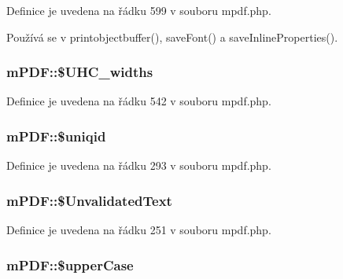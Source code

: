 Definice je uvedena na řádku 599 v souboru mpdf.\-php.



Používá se v printobjectbuffer(), save\-Font() a save\-Inline\-Properties().

\hypertarget{classm_p_d_f_ad63c2a05507035556f2a42057d801f39}{
\subsubsection[{\$\-U\-H\-C\-\_\-widths}]{\setlength{\rightskip}{0pt plus 5cm}m\-P\-D\-F\-::\$\-U\-H\-C\-\_\-widths}}\label{classm_p_d_f_ad63c2a05507035556f2a42057d801f39}


Definice je uvedena na řádku 542 v souboru mpdf.\-php.

\hypertarget{classm_p_d_f_a0cee5dd86653bfb742d11f239d2a665b}{
\subsubsection[{\$uniqid}]{\setlength{\rightskip}{0pt plus 5cm}m\-P\-D\-F\-::\$uniqid}}\label{classm_p_d_f_a0cee5dd86653bfb742d11f239d2a665b}


Definice je uvedena na řádku 293 v souboru mpdf.\-php.

\hypertarget{classm_p_d_f_a529e7530233ff3505dba95f3237e29e1}{
\subsubsection[{\$\-Unvalidated\-Text}]{\setlength{\rightskip}{0pt plus 5cm}m\-P\-D\-F\-::\$\-Unvalidated\-Text}}\label{classm_p_d_f_a529e7530233ff3505dba95f3237e29e1}


Definice je uvedena na řádku 251 v souboru mpdf.\-php.

\hypertarget{classm_p_d_f_a611bd790ef9378c833499d4cf4801447}{
\subsubsection[{\$upper\-Case}]{\setlength{\rightskip}{0pt plus 5cm}m\-P\-D\-F\-::\$upper\-Case}}\label{classm_p_d_f_a611bd790ef9378c833499d4cf4801447}


